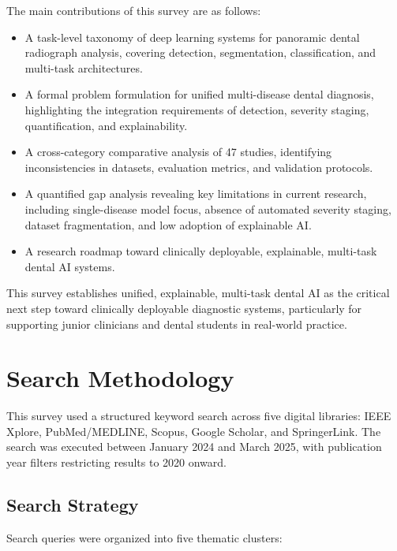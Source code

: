 \documentclass[conference]{IEEEtran}
\begin{document}
The main contributions of this survey are as follows:
\begin{itemize}
    \item A task-level taxonomy of deep learning systems for panoramic
          dental radiograph analysis, covering detection, segmentation,
          classification, and multi-task architectures.
    \item A formal problem formulation for unified multi-disease dental
          diagnosis, highlighting the integration requirements of
          detection, severity staging, quantification, and
          explainability.
    \item A cross-category comparative analysis of 47 studies,
          identifying inconsistencies in datasets, evaluation metrics,
          and validation protocols.
    \item A quantified gap analysis revealing key limitations in current
          research, including single-disease model focus, absence of
          automated severity staging, dataset fragmentation, and low
          adoption of explainable AI.
    \item A research roadmap toward clinically deployable, explainable,
          multi-task dental AI systems.
\end{itemize}

This survey establishes unified, explainable, multi-task dental AI as
the critical next step toward clinically deployable diagnostic systems,
particularly for supporting junior clinicians and dental students in
real-world practice.




\section{Search Methodology}
\label{sec:methodology}

This survey used a structured keyword search across five digital
libraries: IEEE Xplore, PubMed/MEDLINE, Scopus, Google Scholar, and
SpringerLink. The search was executed between January 2024 and March
2025, with publication year filters restricting results to 2020 onward.

\subsection{Search Strategy}

Search queries were organized into five thematic clusters:
\end{document}
